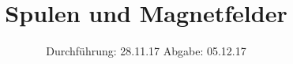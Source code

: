 

\subject{V308}
\title{Spulen und Magnetfelder}
\date{
  Durchführung: 28.11.17
  \hspace{3em}
  Abgabe: 05.12.17
}



\maketitle
\thispagestyle{empty}
\tableofcontents
\newpage




%



\newpage
\printbibliography


